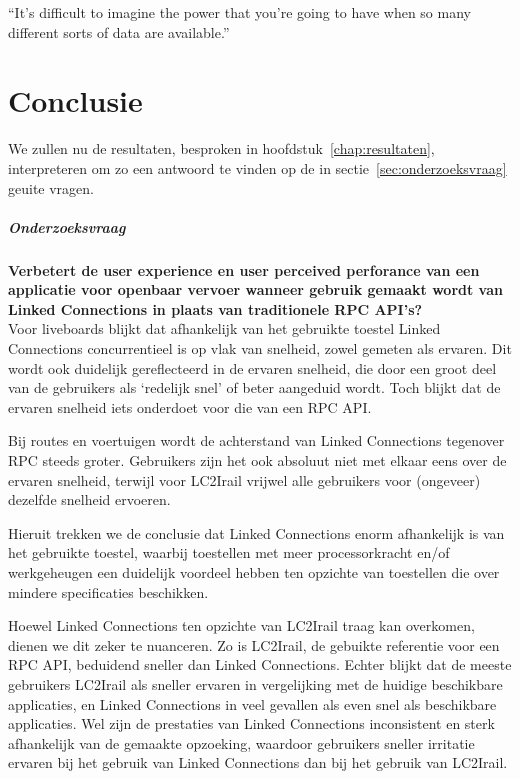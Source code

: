 \begin{savequote}[0.55\linewidth]
	``It’s difficult to imagine the power that you’re going to have when so many different sorts of data are available.''
\end{savequote}

\chapter{Conclusie}
\label{chap:interpretatie}

We zullen nu de resultaten, besproken in hoofdstuk~\ref{chap:resultaten}, interpreteren om zo een antwoord te vinden op de in sectie~\ref{sec:onderzoeksvraag} geuite vragen.

\paragraph{Onderzoeksvraag}  \textbf{Verbetert de user experience en user perceived perforance van een applicatie voor openbaar vervoer wanneer gebruik gemaakt wordt van Linked Connections in plaats van traditionele RPC API's?}\\

Voor liveboards blijkt dat afhankelijk van het gebruikte toestel Linked Connections concurrentieel is op vlak van snelheid, zowel gemeten als ervaren. Dit wordt ook duidelijk gereflecteerd in de ervaren snelheid, die door een groot deel van de gebruikers als `redelijk snel' of beter aangeduid wordt. Toch blijkt dat de ervaren snelheid iets onderdoet voor die van een RPC API.

Bij routes en voertuigen wordt de achterstand van Linked Connections tegenover RPC steeds groter. Gebruikers zijn het ook absoluut niet met elkaar eens over de ervaren snelheid, terwijl voor LC2Irail vrijwel alle gebruikers voor (ongeveer) dezelfde snelheid ervoeren.

Hieruit trekken we de conclusie dat Linked Connections enorm afhankelijk is van het gebruikte toestel,  waarbij toestellen met meer processorkracht en/of werkgeheugen een duidelijk voordeel hebben ten opzichte van toestellen die over mindere specificaties beschikken.

Hoewel Linked Connections ten opzichte van LC2Irail traag kan overkomen, dienen we dit zeker te nuanceren. Zo is LC2Irail, de gebuikte referentie voor een RPC API, beduidend sneller dan Linked Connections. Echter blijkt dat de meeste gebruikers LC2Irail als sneller ervaren in vergelijking met de huidige beschikbare applicaties, en Linked Connections in veel gevallen als even snel als beschikbare applicaties. Wel zijn de prestaties van Linked Connections inconsistent en sterk afhankelijk van de gemaakte opzoeking, waardoor gebruikers sneller irritatie ervaren bij het gebruik van Linked Connections dan bij het gebruik van LC2Irail.

